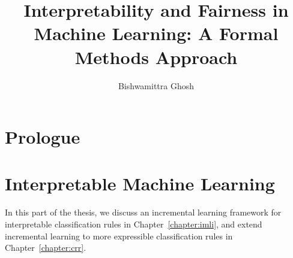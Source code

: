 \newcommand{\propformula}{\phi}
\newcommand{\propclause}{C}
\newcommand{\literal}{V}
\newcommand{\varquantifier}{Q}
\newcommand{\varweight}{W}
\newcommand{\ssatformula}{\Phi}

\newcommand{\graphvertices}{\mathbf{V}}
\newcommand{\graphvertex}{V}
\newcommand{\graphedges}{\mathbf{E}}
\newcommand{\graphedge}{E}
\newcommand{\bncomplexity}{C}
\newcommand{\bnnumdiscrete}{\mathsf{Card}}

\newcommand{\dataset}{\mathbf{D}}
\newcommand{\datadistribution}{\mathcal{D}}

\newcommand{\imli}{\ensuremath{\mathsf{IMLI}}}



\title{Interpretability and Fairness in Machine Learning: A Formal Methods Approach}
\author{Bishwamittra Ghosh}


\maketitle

\declaredate{\today}
\declarationpage

\begin{frontmatter}
%  
  \tableofcontents
  
  
  \listofalgorithms
  \listoffigures
  \listoftables
\end{frontmatter}


\part{Prologue}




\part{Interpretable Machine Learning}
In this part of the thesis, we discuss  an incremental learning framework for interpretable classification rules in Chapter~\ref{chapter:imli}, and extend incremental learning to more expressible classification rules in Chapter~\ref{chapter:crr}. 

